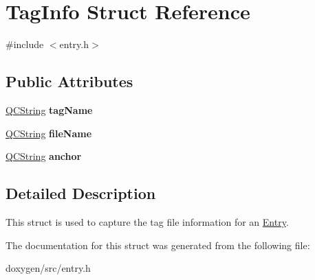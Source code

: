\hypertarget{struct_tag_info}{}\section{Tag\+Info Struct Reference}
\label{struct_tag_info}


{\ttfamily \#include $<$entry.\+h$>$}

\subsection*{Public Attributes}
\begin{DoxyCompactItemize}
\item 
\mbox{\label{struct_tag_info_a8f42f0aff3cb6df860f7b5ba27f6cd2f}} 
\mbox{\hyperlink{class_q_c_string}{Q\+C\+String}} {\bfseries tag\+Name}
\item 
\mbox{\label{struct_tag_info_a7c046d5ccf0095527213dabbbf0949f9}} 
\mbox{\hyperlink{class_q_c_string}{Q\+C\+String}} {\bfseries file\+Name}
\item 
\mbox{\label{struct_tag_info_a1cc95c706df919ed12443c7574e12aa0}} 
\mbox{\hyperlink{class_q_c_string}{Q\+C\+String}} {\bfseries anchor}
\end{DoxyCompactItemize}


\subsection{Detailed Description}
This struct is used to capture the tag file information for an \mbox{\hyperlink{class_entry}{Entry}}. 

The documentation for this struct was generated from the following file\+:\begin{DoxyCompactItemize}
\item 
doxygen/src/entry.\+h\end{DoxyCompactItemize}
